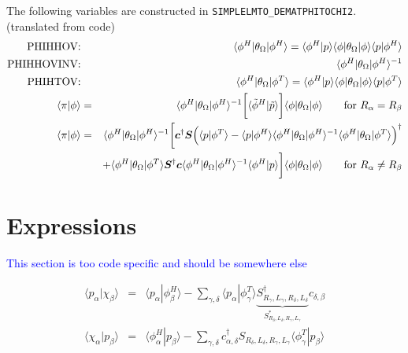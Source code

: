 \documentclass[11pt,a4paper]{report}
\begin{document}
The following variables are constructed in \verb|SIMPLELMTO_DEMATPHITOCHI2|.
(translated from code)
\begin{eqnarray}
\text{PHIHHOV:} && 
\langle\phi^H|\theta_\Omega|\phi^H\rangle
=\langle\phi^H|p\rangle
\langle\phi|\theta_\Omega|\phi\rangle
\langle{p}|\phi^H\rangle
\nonumber\\
%
\text{PHIHHOVINV:} && \langle\phi^H|\theta_\Omega|\phi^H\rangle^{-1}
\nonumber\\
%
\text{PHIHTOV:} && \langle\phi^H|\theta_\Omega|\phi^T\rangle
=\langle\phi^H|p\rangle
\langle\phi|\theta_\Omega|\phi\rangle
\langle{p}|\phi^T\rangle
\nonumber\\
%
\langle\pi|\phi\rangle&=&
\langle\phi^H|\theta_\Omega|\phi^H\rangle^{-1}
\biggl[
\langle\tilde{\phi}^H|\tilde{p}\rangle
\biggr] \langle\phi|\theta_\Omega|\phi\rangle
\qquad\text{for $R_\alpha=R_\beta$}
\nonumber\\
%
%
\langle\pi|\phi\rangle&=&
\langle\phi^H|\theta_\Omega|\phi^H\rangle^{-1}
\biggl[
\mat{c}^\dagger\mat{S}
\Bigl(
\langle{p}|\phi^T\rangle
-\langle{p}|\phi^H\rangle
\langle\phi^H|\theta_\Omega|\phi^H\rangle^{-1}
\langle\phi^H|\theta_\Omega|\phi^T\rangle\Bigr)^\dagger
\nonumber\\
&&+
\langle\phi^H|\theta_\Omega|\phi^T\rangle\mat{S}^\dagger\mat{c}
\langle\phi^H|\theta_\Omega|\phi^H\rangle^{-1}
\langle\phi^H|{p}\rangle
\biggr] \langle\phi|\theta_\Omega|\phi\rangle
\qquad\text{for $R_\alpha\neq R_\beta$}
\end{eqnarray}


\section{Expressions}
\textcolor{blue}{This section is too code specific and should be
  somewhere else}


\begin{eqnarray}
\langle{p}_\alpha|\chi_\beta\rangle&=&
\langle{p}_\alpha|\phi^H_\beta\rangle
-
\sum_{\gamma,\delta}
\langle{p}_\alpha|\phi^T_{\gamma}\rangle 
\underbrace{S^\dagger_{R_\gamma,L_\gamma,R_\delta,L_\delta}
}_{S^*_{R_\delta,L_\delta,R_\gamma,L_\gamma}}
c_{\delta,\beta}
\nonumber\\
%
\langle{\chi}_\alpha|p_\beta\rangle&=&
\langle\phi^H_\alpha|p_\beta\rangle
-
\sum_{\gamma,\delta}
c^\dagger_{\alpha,\delta}
S_{R_\delta,L_\delta,R_\gamma,L_\gamma}
\langle\phi^T_\gamma|p_{\beta}\rangle 
\end{eqnarray}
\end{document}
